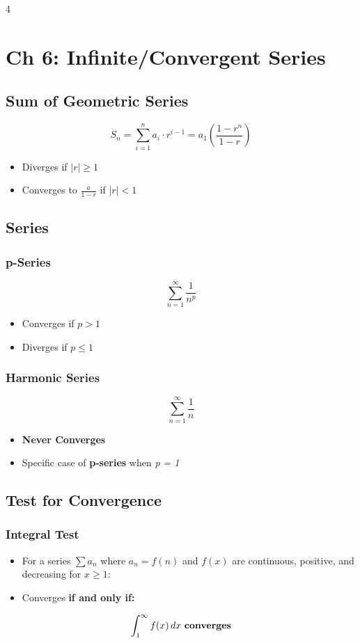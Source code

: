 \documentclass[8pt, landscape, a4paper]{scrartcl}
\begin{document}
\begin{multicols*}{4}
\section*{Ch 6: Infinite/Convergent Series}

\subsection*{Sum of Geometric Series}
\[
    S_n = \sum_{i=1}^{n} a_i \cdot r^{i-1} = a_1\left(\frac{1-r^n}{1-r}\right)
\]
\begin{itemize}
    \item Diverges if $|r| \geq 1$
    \item Converges to $\frac{a}{1-r}$ if $|r| < 1$
\end{itemize}

\subsection*{Series}
    \subsubsection*{p-Series}
    \[
        \sum_{n=1}^{\infty} \frac{1}{n^p}
    \]
    
    \begin{itemize}
        \item Converges if $p > 1$
        \item Diverges if $p \leq 1$
    \end{itemize}
    \subsubsection*{Harmonic Series}
    \[
        \sum_{n=1}^{\infty} \frac{1}{n}
    \]
    \begin{itemize}
        \item \textbf{Never Converges}
    \end{itemize}
\begin{itemize}
    \item Specific case of \textbf{p-series} when \textit{p = 1}
\end{itemize}

\subsection*{Test for Convergence}
    \subsubsection*{Integral Test}
    \begin{itemize}
        \item For a series $\sum a_n$ where $a_n = f(n)$ and $f(x)$ are continuous, positive, and decreasing for $x \geq 1$:
        \item Converges \textbf{if and only if:}
    \end{itemize}
    \[
        \int_{1}^{\infty}f(x)\,dx \text{ \textbf{converges}}
    \]


\end{multicols*}
\end{document}
